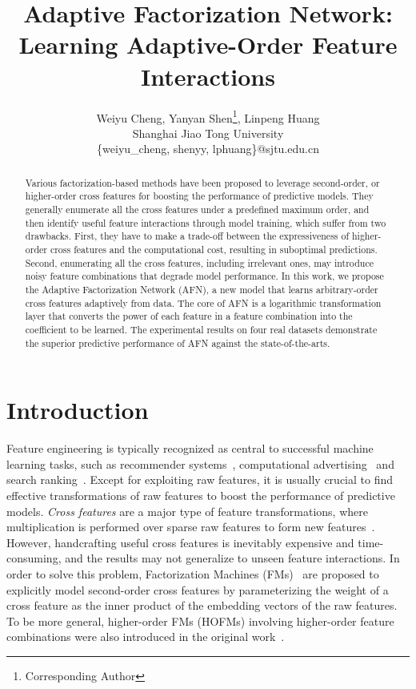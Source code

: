 \documentclass[letterpaper]{article} \usepackage{aaai20}  \usepackage{times}  \usepackage{helvet} \usepackage{courier}  \usepackage[hyphens]{url}  \usepackage{graphicx} \urlstyle{rm} \def\UrlFont{\rm}  \usepackage{graphicx}  \frenchspacing  \setlength{\pdfpagewidth}{8.5in}  \setlength{\pdfpageheight}{11in}
\title{Adaptive Factorization Network: Learning Adaptive-Order Feature Interactions}
\author{Weiyu Cheng, Yanyan Shen\thanks{Corresponding Author}, Linpeng Huang\\
Shanghai Jiao Tong University
\\
\{weiyu\_cheng, shenyy, lphuang\}@sjtu.edu.cn}
\begin{document}
\maketitle

\begin{abstract}

Various factorization-based methods have been proposed to leverage second-order, or higher-order cross features for boosting the performance of predictive models. They generally enumerate all the cross features under a predefined maximum order, and then identify useful feature interactions through model training, which suffer from two drawbacks. First, they have to make a trade-off between the expressiveness of higher-order cross features and the computational cost, resulting in suboptimal predictions. Second, enumerating all the cross features, including irrelevant ones, may introduce noisy feature combinations that degrade model performance. In this work, we propose the Adaptive Factorization Network (AFN), a new model that learns arbitrary-order cross features adaptively from data. The core of AFN is a logarithmic transformation layer that converts the power of each feature in a feature combination into the coefficient to be learned. The experimental results on four real datasets demonstrate the superior predictive performance of AFN against the state-of-the-arts.
\end{abstract}


\section{Introduction}

Feature engineering is typically recognized as central to successful machine learning tasks, such as recommender systems~\cite{Lian:2017:PLJ:3124791.3124794}, computational advertising~\cite{DBLP:conf/kdd/HePJXLXSAHBC14} and search ranking~\cite{DBLP:journals/corr/LianX16}. 
Except for exploiting raw features, it is usually crucial to find effective transformations of raw features to boost the performance of predictive models.
\emph{Cross features} are a major type of feature transformations, where multiplication is performed over sparse raw features to form new features~\cite{wide_and_deep}.
However, handcrafting useful cross features is inevitably expensive and time-consuming, and the results may not generalize to unseen feature interactions.
In order to solve this problem, Factorization Machines (FMs)~\cite{FM,libFM} are proposed to explicitly model second-order cross features by parameterizing the weight of a cross feature as the inner product of the embedding vectors of the raw features. To be more general, higher-order FMs (HOFMs) involving higher-order feature combinations were also introduced in the original work~\cite{FM}.
\end{document}
